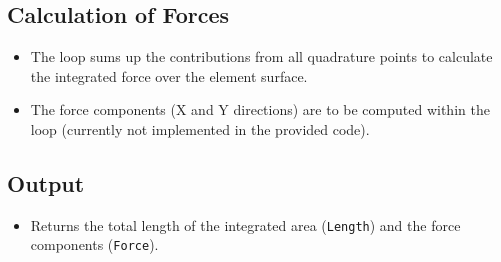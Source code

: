 \documentclass[a4paper,12pt]{article} %
\begin{document}
\subsection*{Calculation of Forces}
\begin{itemize}
    \item The loop sums up the contributions from all quadrature points to calculate the integrated force over the element surface.
    \item The force components (X and Y directions) are to be computed within the loop (currently not implemented in the provided code).
\end{itemize}

\subsection*{Output}
\begin{itemize}
    \item Returns the total length of the integrated area (\texttt{Length}) and the force components (\texttt{Force}).
\end{itemize}
\end{document}
